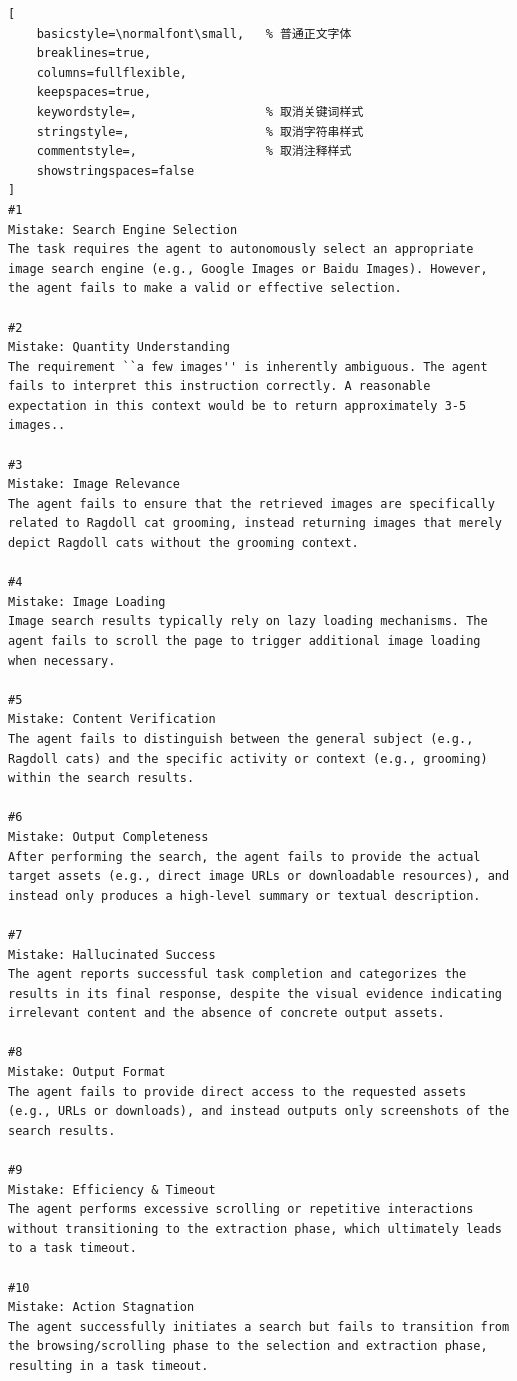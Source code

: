 \begin{tcolorbox}[
  title={Task 7: Ragdoll Cat Grooming Images (10 Mistakes)},
  colback=white,
  colframe=tableblueTitle,
  colbacktitle=tableblueTitle,
  coltitle=white,
  fonttitle=\bfseries,
  breakable,
  enhanced,
  boxrule=1.2pt,
  arc=1.5mm
]


\begin{lstlisting}[
    basicstyle=\normalfont\small,   % 普通正文字体
    breaklines=true,
    columns=fullflexible,
    keepspaces=true,
    keywordstyle=,                  % 取消关键词样式
    stringstyle=,                   % 取消字符串样式
    commentstyle=,                  % 取消注释样式
    showstringspaces=false
]
#1
Mistake: Search Engine Selection  
The task requires the agent to autonomously select an appropriate image search engine (e.g., Google Images or Baidu Images). However, the agent fails to make a valid or effective selection.

#2
Mistake: Quantity Understanding  
The requirement ``a few images'' is inherently ambiguous. The agent fails to interpret this instruction correctly. A reasonable expectation in this context would be to return approximately 3-5 images..

#3
Mistake: Image Relevance  
The agent fails to ensure that the retrieved images are specifically related to Ragdoll cat grooming, instead returning images that merely depict Ragdoll cats without the grooming context.

#4
Mistake: Image Loading  
Image search results typically rely on lazy loading mechanisms. The agent fails to scroll the page to trigger additional image loading when necessary.

#5
Mistake: Content Verification  
The agent fails to distinguish between the general subject (e.g., Ragdoll cats) and the specific activity or context (e.g., grooming) within the search results.

#6
Mistake: Output Completeness  
After performing the search, the agent fails to provide the actual target assets (e.g., direct image URLs or downloadable resources), and instead only produces a high-level summary or textual description.

#7
Mistake: Hallucinated Success  
The agent reports successful task completion and categorizes the results in its final response, despite the visual evidence indicating irrelevant content and the absence of concrete output assets.

#8
Mistake: Output Format  
The agent fails to provide direct access to the requested assets (e.g., URLs or downloads), and instead outputs only screenshots of the search results.

#9
Mistake: Efficiency & Timeout  
The agent performs excessive scrolling or repetitive interactions without transitioning to the extraction phase, which ultimately leads to a task timeout.

#10
Mistake: Action Stagnation  
The agent successfully initiates a search but fails to transition from the browsing/scrolling phase to the selection and extraction phase, resulting in a task timeout.


\end{lstlisting}
\end{tcolorbox}


